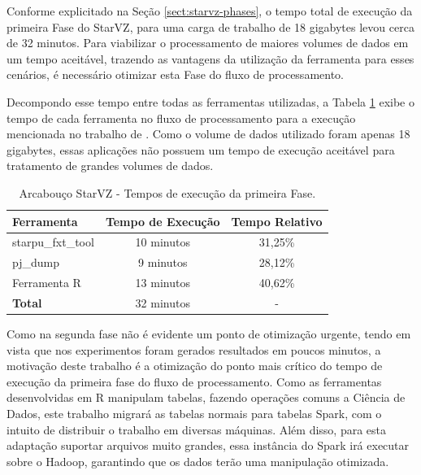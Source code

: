 Conforme explicitado na Seção \ref{sect:starvz-phases}, o tempo total de 
execução da primeira Fase do StarVZ, para uma carga de trabalho de 18 gigabytes 
levou cerca de 32 minutos. Para viabilizar o processamento de maiores volumes de 
dados em um tempo aceitável, trazendo as vantagens da utilização da ferramenta 
para esses cenários, é necessário otimizar esta Fase do fluxo de processamento.

Decompondo esse tempo entre todas as ferramentas utilizadas, a Tabela 
\ref{tab:exectimes} exibe o tempo de cada ferramenta no fluxo de processamento 
para a execução mencionada no trabalho de \citet{ref:starvz}. Como o volume de 
dados utilizado foram apenas 18 gigabytes, essas aplicações não possuem um tempo 
de execução aceitável para tratamento
de grandes volumes de dados.

\begin{table}[H]
\centering
\begin{tabular}{l c c} \toprule
\textbf{Ferramenta}  &  \textbf{Tempo de Execução}  & \textbf{Tempo Relativo}\\ \midrule
starpu\_fxt\_tool     & 10 minutos   & 31,25\%  \\
pj\_dump            & 9 minutos    & 28,12\%     \\
Ferramenta R        & 13 minutos   & 40,62\%      \\
\textbf{Total}     & 32 minutos & -
\end{tabular}
\caption{Arcabouço StarVZ - Tempos de execução da primeira Fase.}
\label{tab:exectimes}
\end{table}

Como na segunda fase não é evidente um ponto de otimização urgente, tendo em 
vista que nos experimentos foram gerados resultados em poucos minutos, a 
motivação deste trabalho é a otimização do ponto mais crítico do tempo de 
execução da primeira fase do fluxo de processamento. Como as ferramentas 
desenvolvidas em R manipulam tabelas, fazendo operações comuns a Ciência de 
Dados, este trabalho migrará as tabelas normais para tabelas Spark, com o 
intuito de distribuir o trabalho em diversas máquinas. Além disso, para esta 
adaptação suportar arquivos muito grandes, essa instância do Spark irá
executar sobre o Hadoop, garantindo que os dados terão uma manipulação 
otimizada.